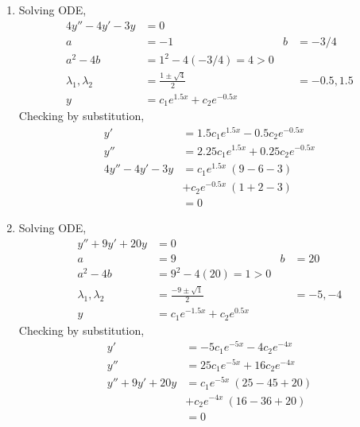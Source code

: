\begin{enumerate}
    \item Solving ODE,
          \begin{align}
              4y'' -4y' - 3y           & = 0                                                \\
              a                        & = -1                             & b & = -3/4      \\
              a^{2} - 4b               & = 1^{2} - 4(-3/4) = 4 > 0                          \\
              \lambda_{1}, \lambda_{2} & = \frac{1 \pm \sqrt{4}}{2}       &   & = -0.5, 1.5 \\
              y                        & = c_{1}e^{1.5x} + c_{2}e^{-0.5x}
          \end{align}
          Checking by substitution,
          \begin{align}
              y'              & = 1.5c_{1}e^{1.5x} - 0.5c_{2}e^{-0.5x}   \\
              y''             & = 2.25c_{1}e^{1.5x} + 0.25c_{2}e^{-0.5x} \\
              4y'' - 4y' - 3y & = c_{1}e^{1.5x}\ (9 - 6  -3)             \\
                              & + c_{2}e^{-0.5x}\ (1 + 2 - 3)            \\
                              & = 0
          \end{align}

    \item Solving ODE,
          \begin{align}
              y'' + 9y' + 20y          & = 0                                             \\
              a                        & = 9                              & b & = 20     \\
              a^{2} - 4b               & = 9^{2} - 4(20) = 1 > 0                         \\
              \lambda_{1}, \lambda_{2} & = \frac{-9 \pm \sqrt{1}}{2}      &   & = -5, -4 \\
              y                        & = c_{1}e^{-1.5x} + c_{2}e^{0.5x}
          \end{align}
          Checking by substitution,
          \begin{align}
              y'              & = -5c_{1}e^{-5x} - 4c_{2}e^{-4x}  \\
              y''             & = 25c_{1}e^{-5x} + 16c_{2}e^{-4x} \\
              y'' + 9y' + 20y & = c_{1}e^{-5x}\ (25 - 45 + 20)    \\
                              & + c_{2}e^{-4x}\ (16 - 36 + 20)    \\
                              & = 0
          \end{align}


\end{enumerate}
